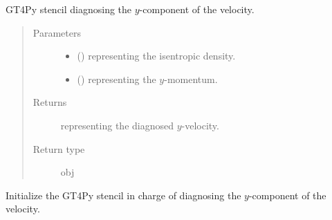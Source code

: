 \documentclass[letterpaper,10pt,english]{sphinxmanual}
\begin{document}
\begin{fulllineitems}

\begin{fulllineitems}
\label{\detokenize{api:dycore.diagnostic_isentropic.DiagnosticIsentropic._stencil_diagnosing_velocity_y_defs}}
GT4Py stencil diagnosing the \(y\)-component of the velocity.
\begin{quote}\begin{description}
\item[{Parameters}] \leavevmode\begin{itemize}
\item {} 
 () \textendash{}  representing the isentropic density.

\item {} 
 () \textendash{}  representing the \(y\)-momentum.

\end{itemize}

\item[{Returns}] \leavevmode
{} representing the diagnosed \(y\)-velocity.

\item[{Return type}] \leavevmode
obj

\end{description}\end{quote}

\end{fulllineitems}


\begin{fulllineitems}
\label{\detokenize{api:dycore.diagnostic_isentropic.DiagnosticIsentropic._stencil_diagnosing_velocity_y_initialize}}
Initialize the GT4Py stencil in charge of diagnosing the \(y\)-component of the velocity.

\end{fulllineitems}



\end{fulllineitems}
\end{document}
